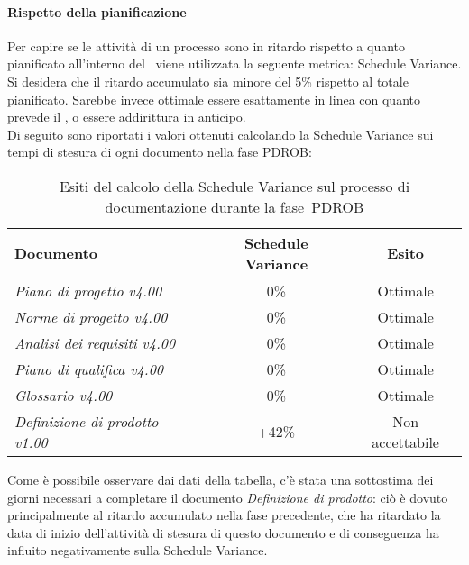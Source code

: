 \documentclass[../PianoDiQualifica.tex]{subfiles}
\begin{document}
\begin{appendices}
			\paragraph{Rispetto della pianificazione}
			Per capire se le attività di un processo sono in ritardo rispetto a quanto pianificato all'interno del \pianodiprogetto\ viene utilizzata la seguente metrica: Schedule Variance.\\
			Si desidera che il ritardo accumulato sia minore del 5\% rispetto al totale pianificato. Sarebbe invece ottimale essere esattamente in linea con quanto prevede il \pianodiprogetto, o essere addirittura in anticipo.\\
			Di seguito sono riportati i valori ottenuti calcolando la Schedule Variance sui tempi di stesura di ogni documento nella fase PDROB:
			\begin{table}[H]
				\centering
				\begin{tabular}{l * {2}{c}}
					\toprule
					\textbf{Documento} & \textbf{Schedule Variance} & \textbf{Esito} \\
					\midrule
					\textit{Piano di progetto v4.00} & 0\% &  Ottimale \\
					\textit{Norme di progetto v4.00} & 0\% & Ottimale \\
					\textit{Analisi dei requisiti v4.00} & 0\% & Ottimale \\
					\textit{Piano di qualifica v4.00} & 0\% & Ottimale \\
					\textit{Glossario v4.00} & 0\% & Ottimale \\
					\textit{Definizione di prodotto v1.00} & +42\% & Non accettabile \\
					\bottomrule
				\end{tabular}
				\caption{Esiti del calcolo della Schedule Variance sul processo di documentazione durante la fase\g\ PDROB}
				\label{tab:esiti_schedule_variance}
			\end{table}
			Come è possibile osservare dai dati della tabella, c'è stata una sottostima dei giorni necessari a completare il documento \textit{Definizione di prodotto}: ciò è dovuto principalmente al ritardo accumulato nella fase precedente, che ha ritardato la data di inizio dell'attività di stesura di questo documento e di conseguenza ha influito negativamente sulla Schedule Variance.
			

\end{appendices}
\end{document}
